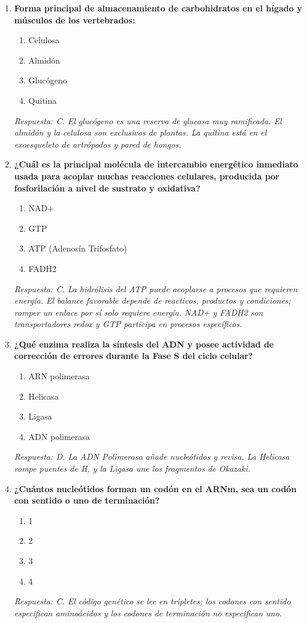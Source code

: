 \begin{enumerate}[label=\textbf{\arabic*.}]
    \item \textbf{Forma principal de almacenamiento de carbohidratos en el hígado y músculos de los vertebrados:}
    \begin{enumerate}
        \item[A)] Celulosa
        \item[B)] Almidón
        \item[C)] Glucógeno
        \item[D)] Quitina
    \end{enumerate}
    \textit{Respuesta: C. El glucógeno es una reserva de glucosa muy ramificada. El almidón y la celulosa son exclusivos de plantas. La quitina está en el exoesqueleto de artrópodos y pared de hongos.}

    \item \textbf{¿Cuál es la principal molécula de intercambio energético inmediato usada para acoplar muchas reacciones celulares, producida por fosforilación a nivel de sustrato y oxidativa?}
    \begin{enumerate}
        \item[A)] NAD+
        \item[B)] GTP
        \item[C)] ATP (Adenosín Trifosfato)
        \item[D)] FADH2
    \end{enumerate}
    \textit{Respuesta: C. La hidrólisis del ATP puede acoplarse a procesos que requieren energía. El balance favorable depende de reactivos, productos y condiciones; romper un enlace por sí solo requiere energía. NAD+ y FADH2 son transportadores redox y GTP participa en procesos específicos.}

    \item \textbf{¿Qué enzima realiza la síntesis del ADN y posee actividad de corrección de errores durante la Fase S del ciclo celular?}
    \begin{enumerate}
        \item[A)] ARN polimerasa
        \item[B)] Helicasa
        \item[C)] Ligasa
        \item[D)] ADN polimerasa
    \end{enumerate}
    \textit{Respuesta: D. La ADN Polimerasa añade nucleótidos y revisa. La Helicasa rompe puentes de H, y la Ligasa une los fragmentos de Okazaki.}

    \item \textbf{¿Cuántos nucleótidos forman un codón en el ARNm, sea un codón con sentido o uno de terminación?}
    \begin{enumerate}
        \item[A)] 1
        \item[B)] 2
        \item[C)] 3
        \item[D)] 4
    \end{enumerate}
    \textit{Respuesta: C. El código genético se lee en tripletes; los codones con sentido especifican aminoácidos y los codones de terminación no especifican uno.}


\end{enumerate}
